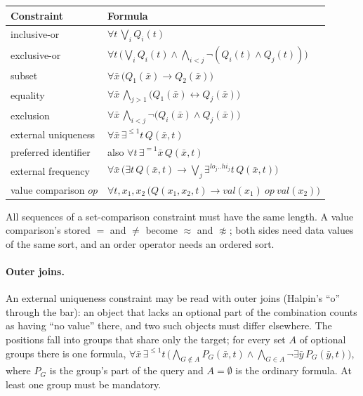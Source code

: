 \documentclass[11pt, a4paper]{article}
\newcommand{\val}{\mathit{val}}
\begin{document}
\begin{center}
\small
\begin{tabularx}{\textwidth}{l X}
\toprule
\textbf{Constraint} & \textbf{Formula} \\
\midrule
inclusive-or & $\forall t\, \bigvee_i Q_i(t)$ \\
exclusive-or & $\forall t\, \bigl(\bigvee_i Q_i(t) \wedge \bigwedge_{i<j}\neg(Q_i(t)\wedge Q_j(t))\bigr)$ \\
subset & $\forall \bar x\,\bigl(Q_1(\bar x) \to Q_2(\bar x)\bigr)$ \\
equality & $\forall \bar x\,\bigwedge_{j>1}\bigl(Q_1(\bar x) \leftrightarrow Q_j(\bar x)\bigr)$ \\
exclusion & $\forall \bar x\,\bigwedge_{i<j}\neg\bigl(Q_i(\bar x) \wedge Q_j(\bar x)\bigr)$ \\
external uniqueness & $\forall \bar x\,\exists^{\le 1} t\, Q(\bar x, t)$ \\
\quad preferred identifier & also $\forall t\,\exists^{=1}\bar x\, Q(\bar x, t)$ \\
external frequency & $\forall \bar x\,\bigl(\exists t\,Q(\bar x,t) \to \bigvee_j \exists^{\mathit{lo}_j..\mathit{hi}_j} t\, Q(\bar x, t)\bigr)$ \\
value comparison $\mathit{op}$ & $\forall t, x_1, x_2\,\bigl(Q(x_1,x_2,t) \to \val(x_1)\ \mathit{op}\ \val(x_2)\bigr)$ \\
\bottomrule
\end{tabularx}
\end{center}

All sequences of a set-comparison constraint must have the same length. A
value comparison's stored $=$ and $\ne$ become $\approx$ and $\not\approx$;
both sides need data values of the same sort, and an order operator needs an
ordered sort.

\paragraph{Outer joins.} An external uniqueness constraint may be read with
outer joins (Halpin's ``o'' through the bar): an object that lacks an
optional part of the combination counts as having ``no value'' there, and
two such objects must differ elsewhere. The positions fall into groups that
share only the target; for every set $A$ of optional groups there is one
formula, $\forall \bar x\,\exists^{\le 1} t\,\bigl(\bigwedge_{G\notin
A}P_G(\bar x,t) \wedge \bigwedge_{G\in A}\neg\exists\bar y\,P_G(\bar
y,t)\bigr)$, where $P_G$ is the group's part of the query and $A=\emptyset$ is
the ordinary formula. At least one group must be mandatory.
\end{document}
